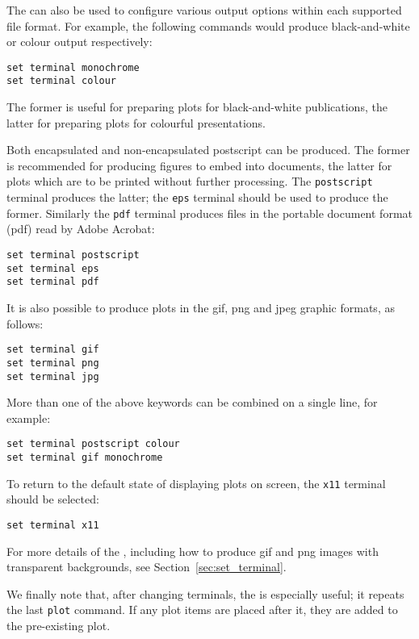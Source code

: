 The  can also be used to configure various output options
within each supported file format.  For example, the following commands would
produce black-and-white or colour output respectively:

\begin{verbatim}
set terminal monochrome
set terminal colour
\end{verbatim}

\noindent The former is useful for preparing plots for black-and-white
publications, the latter for preparing plots for colourful presentations.

Both encapsulated and non-encapsulated postscript can be produced. The former
is recommended for producing figures to embed into documents, the latter for
plots which are to be printed without further processing. The
{\tt postscript} terminal produces the latter; the {\tt eps} terminal
should be used to produce the former.  Similarly the {\tt pdf} terminal
produces files in the portable document format (pdf) read by
Adobe Acrobat:

\begin{verbatim}
set terminal postscript
set terminal eps
set terminal pdf
\end{verbatim}

It is also possible to produce plots in the gif, png and jpeg graphic formats,
as follows:

\begin{verbatim}
set terminal gif
set terminal png
set terminal jpg
\end{verbatim}

More than one of the above keywords can be combined on a single line, for
example:

\begin{verbatim}
set terminal postscript colour
set terminal gif monochrome
\end{verbatim}

To return to the default state of displaying plots on screen, the {\tt x11}
terminal should be selected:

\begin{verbatim}
set terminal x11
\end{verbatim}

For more details of the , including how to produce gif
and png images with transparent backgrounds, see
Section~\ref{sec:set_terminal}.

We finally note that, after changing terminals, the  is
especially useful; it repeats the last {\tt plot} command. If any plot items
are placed after it, they are added to the pre-existing plot.

